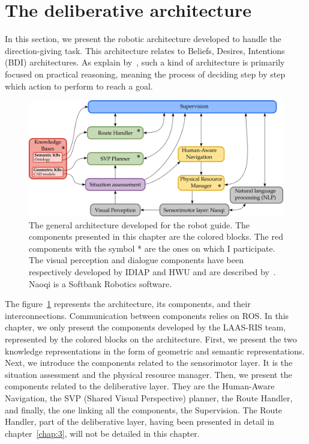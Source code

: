 \section{The deliberative architecture}

In this section, we present the robotic architecture developed to handle the direction-giving task. This architecture relates to Beliefs, Desires, Intentions (BDI) architectures. As explain by~\cite{wooldridge_1999_intelligent}, such a kind of architecture is primarily focused on practical reasoning, meaning the process of deciding step by step which action to perform to reach a goal. 

\begin{figure}[ht!]
\centering
\includegraphics[width=\textwidth]{figures/chapter8/architecture.png}
\caption{\label{fig:chap8_architecture} The general architecture developed for the robot guide. The components presented in this chapter are the colored blocks. The red components with the symbol * are the ones on which I participate. The visual perception and dialogue components have been respectively developed by IDIAP and HWU and are described by~\cite{foster_2019_mummer}. Naoqi is a Softbank Robotics software. }
\end{figure}

The figure~\ref{fig:chap8_architecture} represents the architecture, its components, and their interconnections. Communication between components relies on ROS. In this chapter, we only present the components developed by the LAAS-RIS team, represented by the colored blocks on the architecture. First, we present the two knowledge representations in the form of geometric and semantic representations. Next, we introduce the components related to the sensorimotor layer. It is the situation assessment and the physical resource manager. Then, we present the components related to the deliberative layer. They are the Human-Aware Navigation, the SVP (Shared Visual Perspective) planner, the Route Handler, and finally, the one linking all the components, the Supervision. The Route Handler, part of the deliberative layer, having been presented in detail in chapter~\ref{chap:3}, will not be detailed in this chapter.

